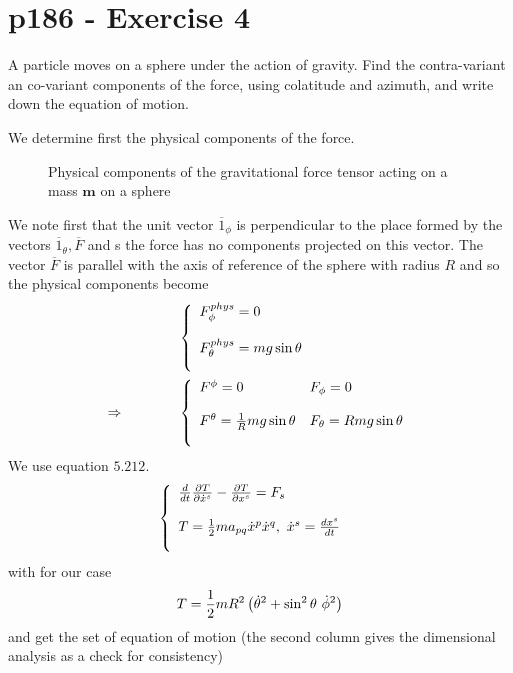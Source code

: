\section{p186 - Exercise 4}
\begin{tcolorbox}
A particle moves on a sphere under the action of gravity. Find the contra-variant an co-variant components of the force, using colatitude and azimuth, and write down the equation of motion.
\end{tcolorbox}
We determine first the physical components of the force.
\begin{figure}[H]

\caption{Physical components of the gravitational force tensor acting on a mass $\mathbf{m}$ on a sphere }
\label{fig:fig_p186_Ex2}
\end{figure}
We note first that the unit vector $\overline{1}_{\phi}$ is perpendicular to the place formed by the vectors  $\overline{1}_{\theta},\overline{F}$ and s the force has no components projected on this vector. The vector $\overline{F}$ is parallel with the axis of reference of the sphere with radius $R$ and so the physical components become
\begin{align}
&\left\{\begin{array}{l}
F_{\phi}^{phys}= 0\\\\
F_{\theta}^{phys}= mg\sin{\theta}\\\\
\end{array}\right.\\
\Rightarrow\quad\quad\quad\quad &\left\{\begin{array}{ll}
F^{\phi}= 0&F_{\phi}= 0\\\\
F^{\theta}= \frac{1}{R}mg\sin{\theta}&F_{\theta}= R m g\sin{\theta}\\\\
\end{array}\right.
\end{align}
We use equation $\mathbf{5.212.}$
\begin{align}
&\left\{\begin{array}{l}
\dv{}{t}\frac{\partial T}{\partial \dot{x}^s} - \frac{\partial T}{\partial x^s} = F_{s}\\\\
T = \frac{1}{2} m a_{pq}\dot{x}^p\dot{x}^q, \ \dot{x}^s=\dv{x^s}{t}\\\\
\end{array}\right.
\end{align}
with for our case
\begin{align}
T = \frac{1}{2} m R^2\left(\dot{\theta}^2+ \sin^2 \theta \ \dot{\phi}^2 \right)
\end{align}
and get the set of equation of motion (the second column gives the dimensional analysis as a check for consistency)


